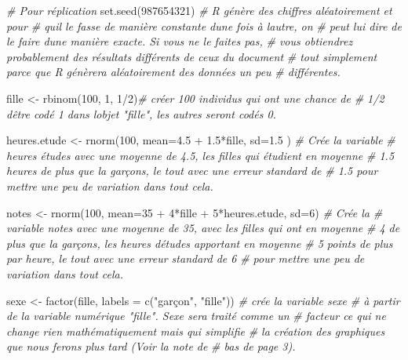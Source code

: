 \documentclass[
]{book}
\newenvironment{Shaded}{\begin{snugshade}}{\end{snugshade}}
\newcommand{\AttributeTok}[1]{\textcolor[rgb]{0.77,0.63,0.00}{#1}}
\newcommand{\CommentTok}[1]{\textcolor[rgb]{0.56,0.35,0.01}{\textit{#1}}}
\newcommand{\DecValTok}[1]{\textcolor[rgb]{0.00,0.00,0.81}{#1}}
\newcommand{\FloatTok}[1]{\textcolor[rgb]{0.00,0.00,0.81}{#1}}
\newcommand{\FunctionTok}[1]{\textcolor[rgb]{0.00,0.00,0.00}{#1}}
\newcommand{\NormalTok}[1]{#1}
\newcommand{\OtherTok}[1]{\textcolor[rgb]{0.56,0.35,0.01}{#1}}
\newcommand{\SpecialCharTok}[1]{\textcolor[rgb]{0.00,0.00,0.00}{#1}}
\newcommand{\StringTok}[1]{\textcolor[rgb]{0.31,0.60,0.02}{#1}}
\begin{document}
\begin{Shaded}
\begin{Highlighting}[]
\CommentTok{\# Pour réplication }
\FunctionTok{set.seed}\NormalTok{(}\DecValTok{987654321}\NormalTok{) }\CommentTok{\# R génère des chiffres aléatoirement et pour}
\CommentTok{\# qu\textquotesingle{}il le fasse de manière constante d\textquotesingle{}une fois à l\textquotesingle{}autre, on}
\CommentTok{\# peut lui dire de le faire d\textquotesingle{}une manière exacte. Si vous ne le faites pas,}
\CommentTok{\# vous obtiendrez probablement des résultats différents de ceux du document}
\CommentTok{\# tout simplement parce que R génèrera aléatoirement des données un peu }
\CommentTok{\# différentes.}

\NormalTok{fille }\OtherTok{\textless{}{-}} \FunctionTok{rbinom}\NormalTok{(}\DecValTok{100}\NormalTok{, }\DecValTok{1}\NormalTok{, }\DecValTok{1}\SpecialCharTok{/}\DecValTok{2}\NormalTok{)}\CommentTok{\# créer 100 individus qui ont une chance de }
\CommentTok{\# 1/2  d\textquotesingle{}être codé 1 dans l\textquotesingle{}objet "fille", les autres seront codés 0. }

\NormalTok{heures.etude }\OtherTok{\textless{}{-}} \FunctionTok{rnorm}\NormalTok{(}\DecValTok{100}\NormalTok{, }\AttributeTok{mean=}\FloatTok{4.5} \SpecialCharTok{+} \FloatTok{1.5}\SpecialCharTok{*}\NormalTok{fille, }\AttributeTok{sd=}\FloatTok{1.5}\NormalTok{ ) }\CommentTok{\# Crée la variable}
\CommentTok{\# heures études avec une moyenne de 4.5, les filles qui étudient en moyenne }
\CommentTok{\# 1.5 heures de plus que la garçons, le tout avec une erreur standard de }
\CommentTok{\# 1.5 pour mettre une peu de variation dans tout cela.}

\NormalTok{notes }\OtherTok{\textless{}{-}} \FunctionTok{rnorm}\NormalTok{(}\DecValTok{100}\NormalTok{, }\AttributeTok{mean=}\DecValTok{35} \SpecialCharTok{+} \DecValTok{4}\SpecialCharTok{*}\NormalTok{fille }\SpecialCharTok{+} \DecValTok{5}\SpecialCharTok{*}\NormalTok{heures.etude, }\AttributeTok{sd=}\DecValTok{6}\NormalTok{) }\CommentTok{\# Crée la }
\CommentTok{\# variable notes avec une moyenne de 35, avec les filles qui ont en moyenne }
\CommentTok{\# 4 de plus que la garçons, les heures d\textquotesingle{}études apportant en moyenne}
\CommentTok{\# 5 points de plus par heure, le tout avec une erreur standard de 6 }
\CommentTok{\# pour mettre une peu de variation dans tout cela. }

\NormalTok{sexe }\OtherTok{\textless{}{-}} \FunctionTok{factor}\NormalTok{(fille, }\AttributeTok{labels =} \FunctionTok{c}\NormalTok{(}\StringTok{"garçon"}\NormalTok{, }\StringTok{"fille"}\NormalTok{)) }\CommentTok{\# crée la variable sexe}
\CommentTok{\# à partir de la variable numérique "fille". Sexe sera traité comme un}
\CommentTok{\# facteur ce qui ne change rien mathématiquement mais qui simplifie }
\CommentTok{\# la création des graphiques que nous ferons plus tard (Voir la note de}
\CommentTok{\# bas de page 3).}


\end{Highlighting}
\end{Shaded}
\end{document}
